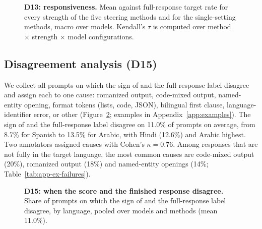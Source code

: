 \begin{figure}[!htbp]
  \centering
  \caption{\textbf{D13: responsiveness.} Mean \dM against full-response target rate for every strength of the five steering methods and for the single-setting methods, macro over models. Kendall's $\tau$ is computed over method $\times$ strength $\times$ model configurations.}
  \label{fig:app-responsiveness}
\end{figure}

\FloatBarrier
\subsection{Disagreement analysis (D15)}
\label{app:disagreement}

We collect all \Deval prompts on which the sign of \dM and the full-response label disagree and assign each to one cause: romanized output, code-mixed output, named-entity opening, format tokens (lists, code, JSON), bilingual first clause, language-identifier error, or other (Figure~\ref{fig:app-disagreement}; examples in Appendix~\ref{app:examples}). The sign of \dM and the full-response label disagree on 11.0\% of prompts on average, from 8.7\% for Spanish to 13.5\% for Arabic, with Hindi (12.6\%) and Arabic highest. Two annotators assigned causes with Cohen's $\kappa=0.76$.  Among \foxp responses that are not fully in the target language, the most common causes are code-mixed output (20\%), romanized output (18\%) and named-entity openings (14\%; Table~\ref{tab:app-ex-failures}).

\begin{figure}[!htbp]
  \centering
  \caption{\textbf{D15: when the score and the finished response disagree.} Share of \Deval prompts on which the sign of \dM and the full-response label disagree, by language, pooled over models and methods (mean 11.0\%).}
  \label{fig:app-disagreement}
\end{figure}

\clearpage
